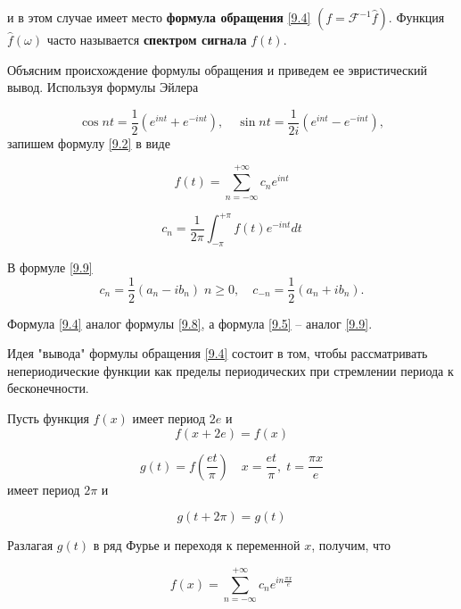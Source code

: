 и в этом случае имеет место \textbf{формула обращения} \ref{9.4}  $(f =\mathscr{F}^{-1} \hat{f})$.
Функция $\hat{f}(\omega)$ часто называется \textbf{спектром сигнала} $f(t)$. 

Объясним происхождение формулы обращения и приведем ее эвристический вывод. Используя формулы Эйлера

\begin{equation}\label{9.7}
	\cos nt = \frac{1}{2}(e^{i n t} + e^{-i n t}), \quad 	\sin nt = \frac{1}{2i}(e^{i n t} - e^{-i n t}), 
\end{equation}
запишем формулу \ref{9.2} в виде

\begin{equation}\label{9.8}
f(t) = \sum_{n = -\infty}^{+\infty} c_n e^{int}
\end{equation}

\begin{equation} \label{9.9}
c_n = \frac{1}{2\pi} \int_{-\pi}^{+\pi} f(t) e^{-i n t} dt
\end{equation}

В формуле \ref{9.9}
\begin{equation}\label{9.10}
c_n = \frac{1}{2}(a_n - ib_n) \; n \geq 0, \quad c_{-n} =  \frac{1}{2}(a_n + ib_n). 
\end{equation}

Формула \ref{9.4} аналог формулы \ref{9.8}, а формула \ref{9.5} -- аналог \ref{9.9}.

Идея "вывода" формулы обращения \ref{9.4} состоит в том, чтобы рассматривать непериодические функции как пределы периодических при стремлении периода к бесконечности. 

Пусть функция $f(x)$ имеет период $2e$ и
\begin{equation}\label{9.11}
f(x+2e) = f(x)
\end{equation}

\begin{equation}\label{9.12}
g(t) = f\left(\frac{et}{\pi}\right) \quad x = \frac{et}{\pi}, \; t = \frac{\pi x}{e}
\end{equation}
имеет период $2\pi$ и 

\begin{equation}\label{9.13}
g(t+2\pi) = g(t)
\end{equation}

Разлагая $g(t)$ в ряд Фурье и переходя к переменной $x$, получим, что 

\begin{equation}\label{9.14}
f(x) = \sum_{n = -\infty}^{+\infty}c_n e^{i n \frac{\pi x}{e}}
\end{equation}

